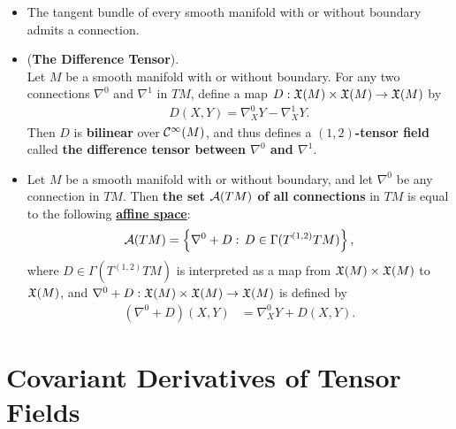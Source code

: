 \documentclass[11pt]{article}
\begin{document}
\begin{itemize}
\item \begin{proposition}
The tangent bundle of every smooth manifold with or without boundary admits a connection.
\end{proposition}

\item 
\begin{proposition} (\textbf{The Difference Tensor}). \\
Let $M$ be a smooth manifold with or without boundary. For any two connections $\nabla^0$ and $\nabla^1$ in $TM$, define a map $D: {\mathfrak X}(M) \times {\mathfrak X}(M) \rightarrow {\mathfrak X}(M)$ by
\begin{align*}
D(X, Y) = \nabla^0_{X}{Y} - \nabla^1_{X}{Y}.
\end{align*} Then $D$ is \textbf{bilinear} over ${\mathcal C}^{\infty}(M)$, and thus defines a \textbf{$(1,2)$-tensor field} called \textbf{the difference tensor between $\nabla^0$ and $\nabla^1$}.
\end{proposition}

\item \begin{theorem}
Let $M$ be a smooth manifold with or without boundary, and let $\nabla^0$ be any connection in $TM$. Then \textbf{the set ${\mathcal A}(TM)$ of all connections} in $TM$ is equal
to the following \underline{\textbf{affine space}}:
\begin{align*}
{\mathcal A}(TM) = \left\{\nabla^0 + D:\, D \in \Gamma(T^{(1,2)}TM)\right\},
\end{align*} 
where $D \in \Gamma(T^{(1,2)}TM)$ is interpreted as a map from $ {\mathfrak X}(M) \times {\mathfrak X}(M)$ to ${\mathfrak X}(M)$, and $\nabla^0 + D: {\mathfrak X}(M) \times {\mathfrak X}(M) \rightarrow {\mathfrak X}(M)$ is defined by
\begin{align*}
(\nabla^0 + D)(X, Y) &= \nabla^0_{X}{Y} + D(X, Y).
\end{align*}
\end{theorem}
\end{itemize}

\section{Covariant Derivatives of Tensor Fields}
\end{document}
